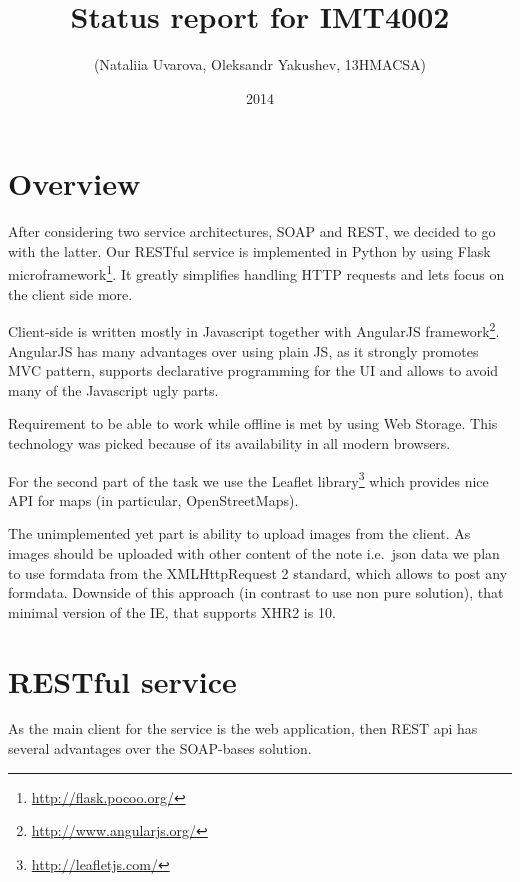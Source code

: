 \documentclass[12pt,a4paper]{article}
\begin{document}
\lstset{
numbers=left,
tabsize=4,
breaklines=true,
title=\lstname,
}
\title{Status report for IMT4002}
\author{(Nataliia Uvarova, Oleksandr Yakushev, 13HMACSA)}
\date{2014}
\maketitle
\onehalfspacing

\section{Overview}

After considering two service architectures, SOAP and REST, we decided
to go with the latter. Our RESTful service is implemented in Python by
using Flask microframework\footnote{\url{http://flask.pocoo.org/}}.
It greatly simplifies handling HTTP requests and lets focus on the
client side more.

Client-side is written mostly in Javascript together with AngularJS
framework\footnote{\url{http://www.angularjs.org/}}. AngularJS has
many advantages over using plain JS, as it strongly promotes MVC
pattern, supports declarative programming for the UI and allows to
avoid many of the Javascript ugly parts.

Requirement to be able to work while offline is met by using Web Storage.
This technology was picked because of its availability in all modern browsers.

For the second part of the task we use the Leaflet
library\footnote{\url{http://leafletjs.com/}} which provides nice API
for maps (in particular, OpenStreetMaps).

The unimplemented yet part is ability to upload images from the client. As images should be
uploaded with other content of the note i.e.\  json data we plan to use formdata from
the XMLHttpRequest 2 standard, which allows to post any formdata. Downside of this approach (in contrast to use
non pure solution), that minimal version of the IE, that supports XHR2 is 10.

\section{RESTful service}
As the main client for the service is the web application, then REST api has
several advantages over the SOAP-bases solution.
\end{document}
